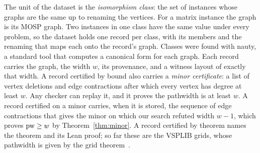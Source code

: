 The unit of the dataset is the \emph{isomorphism class}: the set of instances
whose graphs are the same up to renaming the vertices. For a matrix instance
the graph is its MOSP graph. Two instances in one class have the same value
under every problem, so the dataset holds one record per class, with its
members and the renaming that maps each onto the record's graph. Classes were
found with nauty, a standard tool that computes a canonical form for each
graph. Each record carries the graph, the width $w$, its provenance, and a
witness layout of exactly that width. A record certified by bound also carries
a \emph{minor certificate}: a list of vertex deletions and edge contractions
after which every vertex has degree at least $w$. Any checker can replay it,
and it proves the pathwidth is at least $w$. A record certified on a minor
carries, when it is stored, the sequence of edge contractions that gives
the minor on which our search refuted width $w-1$, which proves $\mathrm{pw}\ge w$ by
Theorem~\ref{thm:minor}. A record certified by theorem names the theorem and
its Lean proof; so far these are the VSPLIB grids, whose pathwidth is given by
the grid theorem~.

\begin{table}[t]
\centering\small
\caption{Twenty collections, 21,754 instance files, reduce to 17,714
isomorphism classes, and 16,634 of them have a certified pathwidth with a
witness layout. Largely open: PACE, the VSPLIB Harwell--Boeing graphs, and the
MOSP sets of de Carvalho and Soma and of Frinhani et al. \emph{Classes}: isomorphism classes within the
collection (78 graphs above 5,000 vertices are compared by file content only).
\emph{Counted here}: classes whose first member, in the order of the table,
is in this collection, so the column sums to the dataset's class count. The
next six columns split those classes by provenance: certified by search on
the graph, by search on a contracted minor (Theorem~\ref{thm:minor}), by a
lower bound, or by a theorem; or an upper bound only. \emph{No witnessed
value}: no layout is stored yet; this includes one Rome class whose pathwidth
is certified but which has no stored layout of that width. $^{a}$The same 46 files distributed a second
time under other names; every class is counted under its first copy.}
\label{tab:dataset}
\resizebox{\linewidth}{!}{}
\end{table}

